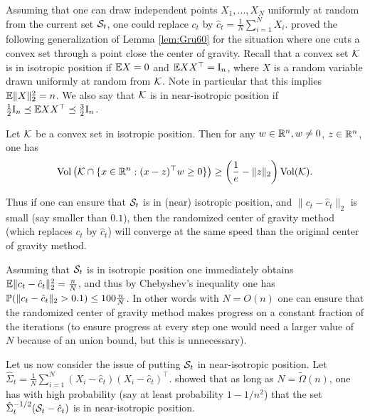 Assuming that one can draw independent points $X_1, \hdots, X_N$ uniformly at random from the current set $\cS_t$, one could replace $c_t$ by $\hat{c}_t = \frac{1}{N} \sum_{i=1}^N X_i$. \cite{BerVem04} proved the following generalization of Lemma \ref{lem:Gru60} for the situation where one cuts a convex set through a point close the center of gravity. Recall that a convex set $\cK$ is in isotropic position if $\E X = 0$ and $\E X X^{\top} = \mI_n$, where $X$ is a random variable drawn uniformly at random from $\cK$. Note in particular that this implies $\E \|X\|_2^2 = n$. We also say that $\cK$ is in near-isotropic position if $\frac{1}{2} \mI_n \preceq \E X X^{\top} \preceq \frac3{2} \mI_n$.
\begin{lemma} \label{lem:BerVem04}
Let $\cK$ be a convex set in isotropic position. Then for any $w \in \R^n, w \neq 0$, $z \in \R^n$, one has
$$\mathrm{Vol} \left( \cK \cap \{x \in \R^n : (x-z)^{\top} w \geq 0\} \right) \geq \left(\frac{1}{e} - \|z\|_2\right) \mathrm{Vol} (\cK) .$$
\end{lemma}
Thus if one can ensure that $\cS_t$ is in (near) isotropic position, and $\|c_t - \hat{c}_t\|_2$ is small (say smaller than $0.1$), then the randomized center of gravity method (which replaces $c_t$ by $\hat{c}_t$) will converge at the same speed than the original center of gravity method. 

Assuming that $\cS_t$ is in isotropic position one immediately obtains $\E \|c_t - \hat{c}_t\|_2^2 = \frac{n}{N}$, and thus by Chebyshev's inequality one has $\P(\|c_t - \hat{c}_t\|_2 > 0.1) \leq 100 \frac{n}{N}$. In other words with $N = O(n)$ one can ensure that the randomized center of gravity method makes progress on a constant fraction of the iterations (to ensure progress at every step one would need a larger value of $N$ because of an union bound, but this is unnecessary).

Let us now consider the issue of putting $\cS_t$ in near-isotropic position. Let $\hat{\Sigma}_t = \frac1{N} \sum_{i=1}^N (X_i-\hat{c}_t) (X_i-\hat{c}_t)^{\top}$. \cite{Rud99} showed that as long as $N= \tilde{\Omega}(n)$, one has with high probability (say at least probability $1-1/n^2$) that the set $\hat{\Sigma}_t^{-1/2} (\cS_t - \hat{c}_t)$ is in near-isotropic position.

